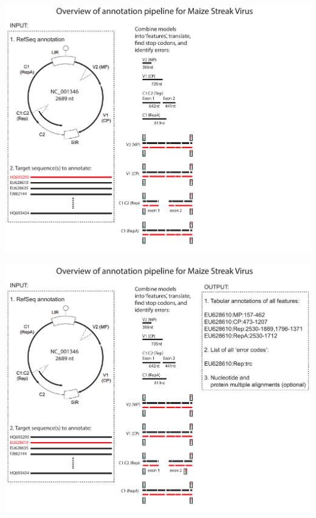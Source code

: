 \documentclass[landscape]{slides}
\begin{document}
\begin{slide}
\begin{center}
\includegraphics[width=10in]{figs/annotation-schematic-msv-3}
\end{center}
\vfill
\end{slide}
\begin{slide}
\begin{center}
\includegraphics[width=10in]{figs/annotation-schematic-msv-4}
\end{center}
\vfill
\end{slide}
\end{document}
